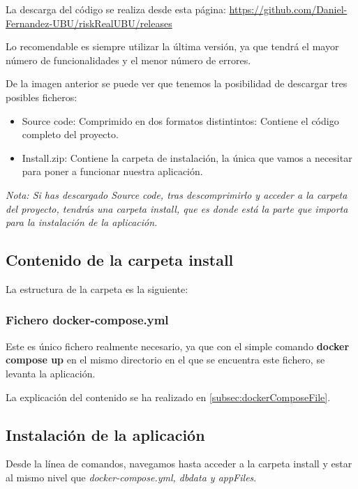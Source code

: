 La descarga del código se realiza desde esta página: \url{https://github.com/Daniel-Fernandez-UBU/riskRealUBU/releases}


Lo recomendable es siempre utilizar la última versión, ya que tendrá el mayor número de funcionalidades y el menor número de errores.

De la imagen anterior se puede ver que tenemos la posibilidad de descargar tres posibles ficheros:

\begin{itemize}
	\item Source code: Comprimido en dos formatos distintintos: Contiene el código completo del proyecto.
	\item Install.zip: Contiene la carpeta de instalación, la única que vamos a necesitar para poner a funcionar nuestra aplicación.
\end{itemize}

\textit{Nota: Si has descargado Source code, tras descomprimirlo y acceder a la carpeta del proyecto, tendrás una carpeta install, que es donde está la parte que importa para la instalación de la aplicación.}

\subsection{Contenido de la carpeta install}

La estructura de la carpeta es la siguiente:


\subsubsection{Fichero docker-compose.yml}

Este es único fichero realmente necesario, ya que con el simple comando \textbf{docker compose up} en el mismo directorio en el que se encuentra este fichero, se levanta la aplicación.

La explicación del contenido se ha realizado en \ref{subsec:dockerComposeFile}.

\subsection{Instalación de la aplicación}

Desde la línea de comandos, navegamos hasta acceder a la carpeta install y estar al mismo nivel que \textit{docker-compose.yml, dbdata y appFiles}.

